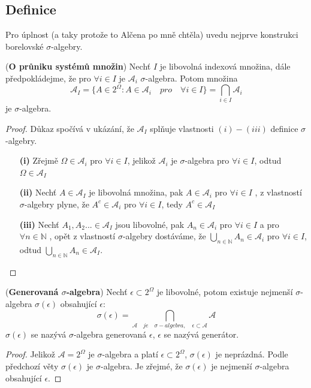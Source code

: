 \subsection{Definice}
Pro úplnost (a taky protože to Alčena po mně chtěla) uvedu nejprve konstrukci borelovské $\sigma$-algebry.
\begin{theorem}{(\textbf{O průniku systémů množin})}
Nechť $I$ je libovolná indexová množina, dále předpokládejme, že pro $\forall i \in I$ je $\mathcal{A}_{i}$ $\sigma$-algebra. Potom množina $$\mathcal{A}_{I} = \lbrace A \in 2^{\Omega} : A \in \mathcal{A}_{i} \quad pro \quad \forall i \in I \rbrace = \bigcap_{i \in I} \mathcal{A}_{i}$$ je $\sigma$-algebra. 
\end{theorem}
\begin{proof}
Důkaz spočívá v ukázání, že $\mathcal{A}_{I}$ splňuje vlastnosti $(i) - (iii)$ definice $\sigma$-algebry.
\begin{itemize}
\item[\textbf{(i)}] Zřejmě $\Omega \in \mathcal{A}_{i}$ pro $\forall i \in I$, jelikož $\mathcal{A}_{i}$ je $\sigma$-algebra pro $\forall i \in I$, odtud $\Omega \in \mathcal{A}_{I}$
\item[\textbf{(ii)}] Nechť $A\in \mathcal{A}_{I}$ je libovolná množina, pak $A\in \mathcal{A}_{i}$ pro $\forall i \in I$ , z vlastností $\sigma$-algebry plyne, že $A^{c}\in \mathcal{A}_{i}$ pro $\forall i \in I$, tedy $A^{c}\in \mathcal{A}_{I}$
\item[\textbf{(iii)}] Nechť $A_{1},A_{2}...\in \mathcal{A}_{I}$ jsou libovolné, pak $A_{n}\in \mathcal{A}_{i}$ pro $\forall i \in I$ a pro $\forall n \in \mathbb{N}$ , opět z vlastností $\sigma$-algebry dostáváme, že $ \bigcup_{n \in \mathbb{N}}A_{n} \in \mathcal{A}_{i} $ pro $\forall i \in I$, odtud $\bigcup_{n \in \mathbb{N}}A_{n} \in \mathcal{A}_{I}$.
\end{itemize}
\end{proof}
\begin{theorem}{(\textbf{Generovaná $\sigma$-algebra})}
Nechť $\epsilon \subset 2^{\Omega}$ je libovolné, potom existuje nejmenší $\sigma$-algebra $\sigma(\epsilon)$ obsahující $\epsilon$: $$\sigma(\epsilon) = \bigcap_{\mathcal{A} \quad je \quad \sigma-algebra, \quad \epsilon \subset \mathcal{A}}\mathcal{A}$$ 
$\sigma(\epsilon)$ se nazývá $\sigma$-algebra generovaná $\epsilon$, $\epsilon$ se nazývá generátor.
\end{theorem}
\begin{proof}
Jelikož $\mathcal{A} = 2^{\Omega}$ je $\sigma$-algebra a platí $\epsilon \subset 2^{\Omega}$, $\sigma(\epsilon)$ je neprázdná. Podle předchozí věty $\sigma(\epsilon)$ je $\sigma$-algebra. Je zřejmé, že $\sigma(\epsilon)$ je nejmenší $\sigma$-algebra obsahující $\epsilon$.
\end{proof}


